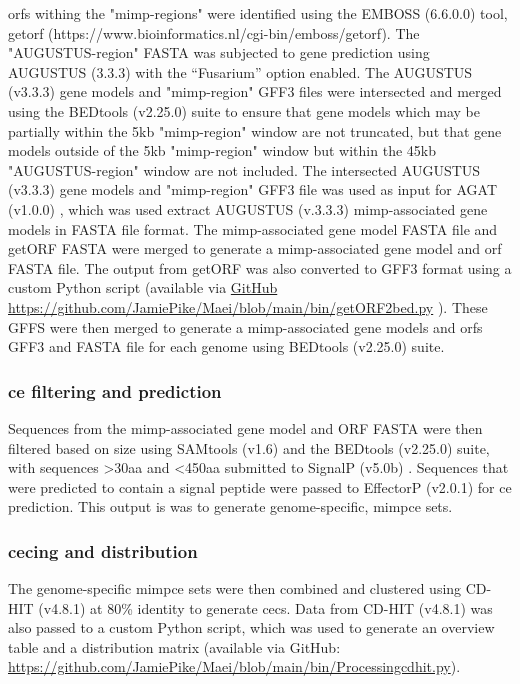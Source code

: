 \Acp{orf} withing the "\ac{mimp}-regions" were identified using the EMBOSS (6.6.0.0) tool, getorf (https://www.bioinformatics.nl/cgi-bin/emboss/getorf). The "AUGUSTUS-region" FASTA was subjected to gene prediction using AUGUSTUS (3.3.3) \parencite{Stanke2006} with the “Fusarium” option enabled. The AUGUSTUS (v3.3.3) gene models and "\ac{mimp}-region" GFF3 files were intersected and merged using the BEDtools (v2.25.0) suite \parencite{Quinlan2010} to ensure that gene models which may be partially within the 5kb "\ac{mimp}-region" window are not truncated, but that gene models outside of the 5kb "\ac{mimp}-region" window but within the 45kb "AUGUSTUS-region" window are not included. The intersected AUGUSTUS (v3.3.3) gene models and "\ac{mimp}-region" GFF3 file was used as input for AGAT (v1.0.0) \parencite{DainatN.D.}, which was used extract AUGUSTUS (v.3.3.3) \ac{mimp}-associated gene models in FASTA file format. The \ac{mimp}-associated gene model FASTA file and getORF FASTA were merged to generate a \ac{mimp}-associated gene model and \ac{orf} FASTA file. The output from getORF was also converted to GFF3 format using a custom Python script (available via \href{https://github.com/JamiePike/Maei/blob/main/bin/getORF2bed.py}{ GitHub https://github.com/JamiePike/Maei/blob/main/bi\-n/getORF2bed.py}
). These GFFS were then merged to generate a \ac{mimp}-associated gene models and \acp{orf} GFF3 and FASTA file for each genome using BEDtools (v2.25.0) suite.

\subsubsection{\ac{ce} filtering and prediction}

Sequences from the \ac{mimp}-associated gene model and ORF FASTA were then filtered based on size using SAMtools (v1.6) and the BEDtools (v2.25.0) suite, with sequences >30aa and <450aa submitted to SignalP (v5.0b) \parencite{Petersen2011}. Sequences that were predicted to contain a signal peptide were passed to EffectorP (v2.0.1) \parencite{Sperschneider2018} for \ac{ce} prediction. This output is was to generate genome-specific, \ac{mimpce} sets.

\subsubsection{\Acl{cec}ing and distribution}

The genome-specific \ac{mimpce} sets were then combined and clustered using CD-HIT (v4.8.1) \parencite{Fu2012} at 80\% identity to generate \acfp{cec}. Data from CD-HIT (v4.8.1) was also passed to a custom Python script, which was used to generate an overview table and a distribution matrix (available via GitHub: \href{https://github.com/JamiePike/Maei/blob/main/bin/Processingcdhit.py}{https://github.com/Jamie\-Pike/Maei/blob/main/bin/Processingcdhit.py}).

